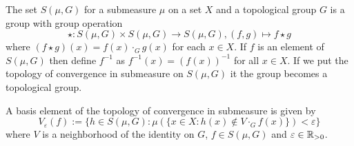 \begin{thm}
  The set $S(\mu, G)$ for a submeasure $\mu$ on a set $X$ and a topological group $G$ is a group with group operation
  \begin{equation*}
    \star\colon S(\mu, G) \times S(\mu, G) \to S(\mu, G), (f, g) \mapsto f \star g
  \end{equation*}
  where $(f\star g)(x) = f(x) \cdot_G g(x)$ for each $x \in X$. If $f$ is an element of $S(\mu, G)$ then define $f^{-1}$ as $f^{-1}(x) = (f(x))^{-1}$ for all $x \in X$. If we put the topology of convergence in submeasure on $S(\mu, G)$ it the group
  becomes a topological group.

  A basis element of the topology of convergence in submeasure is given by
  \begin{equation*}
    V_\varepsilon(f) := \{ h \in S(\mu, G)\colon \mu(\{x \in X\colon h(x) \notin V\cdot_G f(x)\}) < \varepsilon \}
  \end{equation*}
  where $V$ is a neighborhood of the identity on $G$, $f \in S(\mu, G)$ and $\varepsilon \in \mathbb{R}_{>0}$.
\end{thm}

